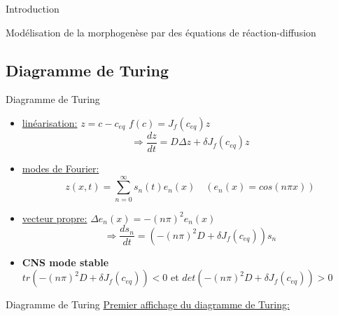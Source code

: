 \documentclass{beamer}
\begin{document}
\begin{frame}{Introduction}
\begin{frame}{Modélisation de la morphogenèse par des équations de réaction-diffusion}
\end{frame}

\subsection{Diagramme de Turing}

\begin{frame}{Diagramme de Turing}

\begin{itemize}
    \item \underline{linéarisation:} $z = c - c_{eq}$ \quad $f(c) = J_{f}(c_{eq})z$
    $$
    \Rightarrow \frac{dz}{dt} = D\Delta z + \delta J_{f}(c_{eq})z
    $$
    \item \underline{modes de Fourier:}
    $$
    z(x,t) = \sum\limits_{n=0}^{\infty}s_{n}(t) e_{n}(x) \quad (e_{n}(x) = cos(n \pi x))
    $$
    \item \underline{vecteur propre:} $\Delta e_{n}(x) = -(n\pi)^{2} e_{n}(x)$
    $$\Rightarrow \frac{ds_{n}}{dt} = (-(n\pi)^{2}D + \delta J_{f}(c_{eq}))s_{n} $$
    \item \textbf{CNS mode stable} \\
    \medskip
    \fboxsep=3pt
    \fboxrule=1.7pt
    \def\bordercolor{purple}
    \def\backgroundcolor{white}
    \fcolorbox{\bordercolor}{\backgroundcolor} {$tr(-(n\pi)^{2}D + \delta J_{f}(c_{eq})) < 0$ et $det(-(n\pi)^{2}D + \delta J_{f}(c_{eq})) > 0$}
    
    
\end{itemize}

\end{frame}

\begin{frame}{Diagramme de Turing}
    \underline{Premier affichage du diagramme de Turing:}
    
    \begin{columns}


\end{columns}
\end{frame}
\end{frame}
\end{document}
